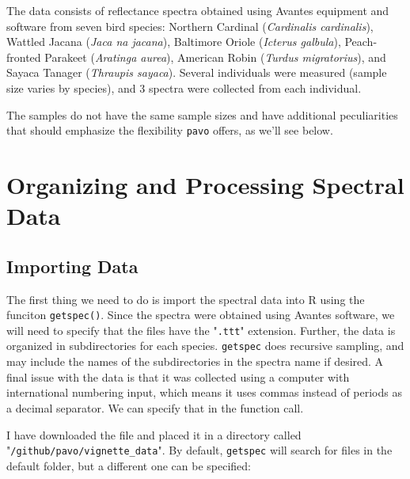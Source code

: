 \documentclass{article}
\newcommand{\pavo}{{\tt pavo}}  %
\newcommand{\code}[1]{{\tt #1}}  %
\begin{document}
The data consists of reflectance spectra obtained using Avantes equipment and software from 
seven bird species: Northern Cardinal (\emph{Cardinalis cardinalis}), Wattled Jacana (\emph{Jaca
na jacana}), Baltimore Oriole (\emph{Icterus galbula}), Peach-fronted Parakeet (\emph{Aratinga 
aurea}), American Robin (\emph{Turdus migratorius}),  and Sayaca Tanager 
(\emph{Thraupis sayaca}). Several individuals were measured (sample size varies by species), and 
3 spectra were collected from each individual.

The samples do not have the same sample sizes and have additional peculiarities that should 
emphasize the flexibility \pavo{} offers, as we'll see below.

\section{Organizing and Processing Spectral Data}

\subsection{Importing Data}

The first thing we need to do is import the spectral data into R using the funciton 
\code{getspec()}. Since the spectra were obtained using Avantes software, we will need to 
specify that the files have the "\code{.ttt}" extension. Further, the data is organized in 
subdirectories for each species. \code{getspec} does recursive sampling, and may include the 
names of the subdirectories in the spectra name if desired. A final issue with the data is that 
it was collected using a computer with international numbering input, which means it uses commas 
instead of periods as a decimal separator. We can specify that in the function call.

I have downloaded the file and placed it in a directory called 
"\nolinkurl{/github/pavo/vignette_data}". By default, \code{getspec} will search for files in 
the default folder, but a different one can be specified:
\end{document}
